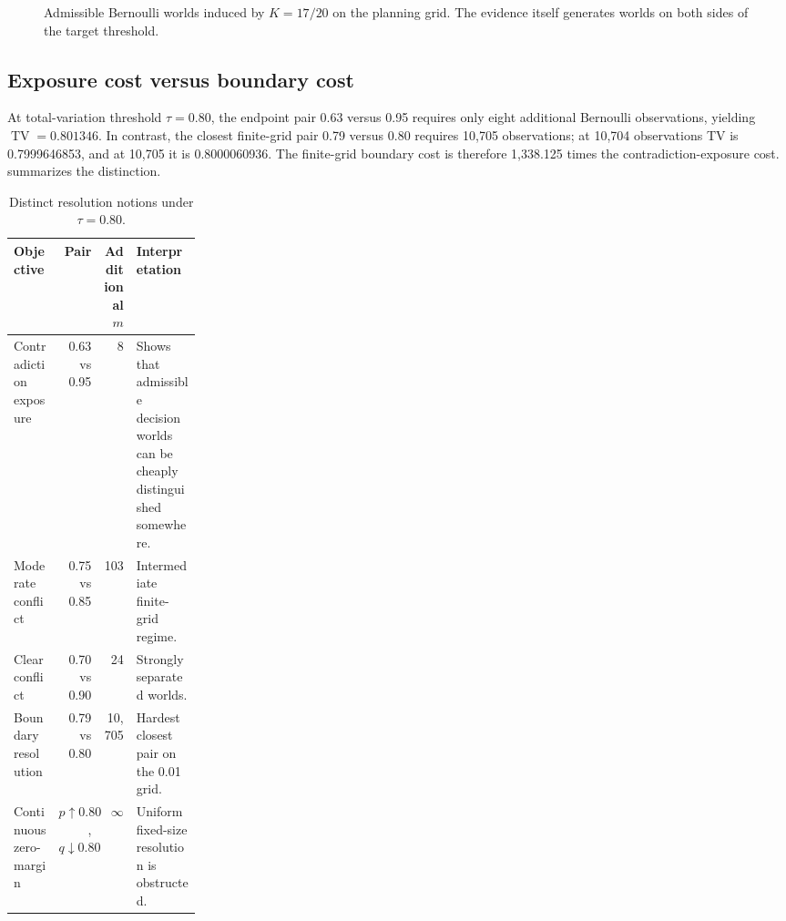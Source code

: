 \documentclass[11pt]{article}
\newcommand{\TV}{\operatorname{TV}}
\begin{document}
\begin{figure}[H]
\centering
{}
\caption{Admissible Bernoulli worlds induced by $K=17/20$ on the planning grid. The evidence itself generates worlds on both sides of the target threshold.}
\label{fig:admissible}
\end{figure}

\subsection{Exposure cost versus boundary cost}
At total-variation threshold $\tau=0.80$, the endpoint pair 0.63 versus 0.95 requires only eight additional Bernoulli observations, yielding $\TV=0.801346$. In contrast, the closest finite-grid pair 0.79 versus 0.80 requires 10,705 observations; at 10,704 observations TV is 0.7999646853, and at 10,705 it is 0.8000060936. The finite-grid boundary cost is therefore 1,338.125 times the contradiction-exposure cost.  summarizes the distinction.

\begin{table}[H]
\centering
\caption{Distinct resolution notions under $\tau=0.80$.}
\label{tab:costs}
\begin{tabularx}{\linewidth}{>{\raggedright\arraybackslash}p{0.24\linewidth}rr>{\raggedright\arraybackslash}X}
\toprule
Objective & Pair & Additional $m$ & Interpretation\\
\midrule
Contradiction exposure & 0.63 vs 0.95 & 8 & Shows that admissible decision worlds can be cheaply distinguished somewhere.\\
Moderate conflict & 0.75 vs 0.85 & 103 & Intermediate finite-grid regime.\\
Clear conflict & 0.70 vs 0.90 & 24 & Strongly separated worlds.\\
Boundary resolution & 0.79 vs 0.80 & 10,705 & Hardest closest pair on the 0.01 grid.\\
Continuous zero-margin & $p\uparrow0.80$, $q\downarrow0.80$ & $\infty$ & Uniform fixed-size resolution is obstructed.\\
\bottomrule
\end{tabularx}
\end{table}
\end{document}
